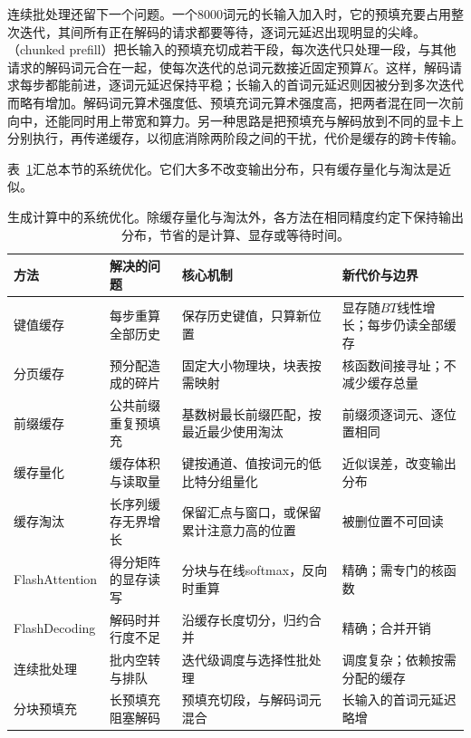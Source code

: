 连续批处理还留下一个问题。一个8000词元的长输入加入时，它的预填充要占用整次迭代，其间所有正在解码的请求都要等待，逐词元延迟出现明显的尖峰。（chunked prefill）把长输入的预填充切成若干段，每次迭代只处理一段，与其他请求的解码词元合在一起，使每次迭代的总词元数接近固定预算$K$。这样，解码请求每步都能前进，逐词元延迟保持平稳；长输入的首词元延迟则因被分到多次迭代而略有增加。解码词元算术强度低、预填充词元算术强度高，把两者混在同一次前向中，还能同时用上带宽和算力。另一种思路是把预填充与解码放到不同的显卡上分别执行，再传递缓存，以彻底消除两阶段之间的干扰，代价是缓存的跨卡传输。

表~\ref{tab:nlp-inference-system-methods}汇总本节的系统优化。它们大多不改变输出分布，只有缓存量化与淘汰是近似。

\begin{table}[htbp]
 \small
 \begin{tabularx}{\linewidth}{@{}p{22mm}p{34mm}p{46mm}X@{}}
  \toprule
  方法 & 解决的问题 & 核心机制 & 新代价与边界\\
  \midrule
  键值缓存 & 每步重算全部历史 & 保存历史键值，只算新位置 & 显存随$BT$线性增长；每步仍读全部缓存\\
  分页缓存 & 预分配造成的碎片 & 固定大小物理块，块表按需映射 & 核函数间接寻址；不减少缓存总量\\
  前缀缓存 & 公共前缀重复预填充 & 基数树最长前缀匹配，按最近最少使用淘汰 & 前缀须逐词元、逐位置相同\\
  缓存量化 & 缓存体积与读取量 & 键按通道、值按词元的低比特分组量化 & 近似误差，改变输出分布\\
  缓存淘汰 & 长序列缓存无界增长 & 保留汇点与窗口，或保留累计注意力高的位置 & 被删位置不可回读\\
  FlashAttention & 得分矩阵的显存读写 & 分块与在线softmax，反向时重算 & 精确；需专门的核函数\\
  FlashDecoding & 解码时并行度不足 & 沿缓存长度切分，归约合并 & 精确；合并开销\\
  连续批处理 & 批内空转与排队 & 迭代级调度与选择性批处理 & 调度复杂；依赖按需分配的缓存\\
  分块预填充 & 长预填充阻塞解码 & 预填充切段，与解码词元混合 & 长输入的首词元延迟略增\\
  \bottomrule
 \end{tabularx}
 \caption{生成计算中的系统优化。除缓存量化与淘汰外，各方法在相同精度约定下保持输出分布，节省的是计算、显存或等待时间。}
 \label{tab:nlp-inference-system-methods}
\end{table}

